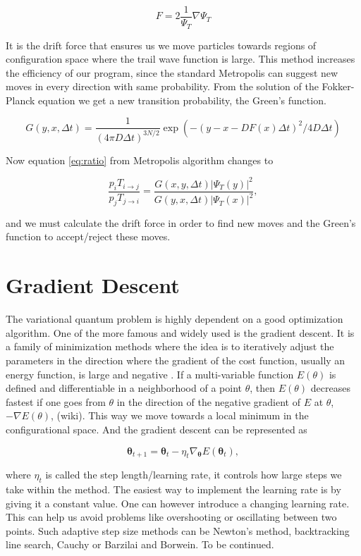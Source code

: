 $$F = 2 \frac{1}{\Psi_T} \nabla \Psi_T$$

It is the drift force that ensures us we move particles towards regions of configuration space where the trail wave function is large. This method increases the efficiency of our program, since the standard Metropolis can suggest new moves in every direction with same probability. 
From the solution of the Fokker-Planck equation we get a new transition probability, the Green's function. 

$$G(y, x, \Delta t) = \frac{1}{(4 \pi D \Delta t)^{3N/2}} \exp (-(y - x - D F(x) \Delta t)^2/4 D \Delta t)$$

Now equation \ref{eq:ratio} from Metropolis algorithm changes to 

$$\frac{p_i T_{i \rightarrow j}}{p_j T_{j \rightarrow i}} = \frac{G(x, y, \Delta t)|\Psi_T(y)|^2}{G(y, x, \Delta t)|\Psi_T(x)|^2},$$

and we must calculate the drift force in order to find new moves and the Green's function to accept/reject these moves.

\section{Gradient Descent}

The variational quantum problem is highly dependent on a good optimization algorithm. One of the more famous and widely used is the gradient descent. It is a family of minimization methods where the idea is to iteratively adjust the parameters in the direction where the gradient of the cost function, usually an energy function, is large and negative \cite{mehta2019high}. 
If a multi-variable function $E(\theta)$ is defined and differentiable in a neighborhood of a point $\theta$, then $E(\theta)$ decreases fastest if one goes from $\theta$ in the direction of the negative gradient of $E$ at $\theta$, $-\nabla E(\theta)$, (wiki). This way we move towards a local minimum in the configurational space. And the gradient descent can be represented as

\begin{equation} \label{eq:theta}
\mathbf{\theta}_{t+1} = \mathbf{\theta}_t - \eta_t \nabla_{\mathbf{\theta}} E(\mathbf{\theta}_t),
\end{equation}

where $\eta_t$ is called the step length/learning rate, it controls how large steps we take within the method.
The easiest way to implement the learning rate is by giving it a constant value. One can however introduce a changing learning rate. This can help us avoid problems like overshooting or oscillating between two points. Such adaptive step size methods can be Newton's method, backtracking line search, Cauchy or Barzilai and Borwein. To be continued. 

